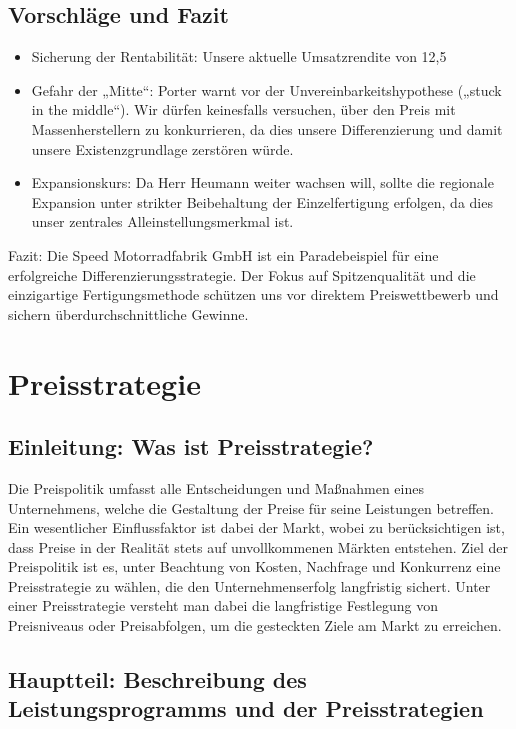 \documentclass[12pt, a4paper]{article}
\begin{document}
\subsection{Vorschläge und Fazit}
\begin{itemize}
    \item Sicherung der Rentabilität: Unsere aktuelle Umsatzrendite von 12,5 %
    \item Gefahr der „Mitte“: Porter warnt vor der Unvereinbarkeitshypothese („stuck in the middle“). Wir dürfen keinesfalls versuchen, über den Preis mit Massenherstellern zu konkurrieren, da dies unsere Differenzierung und damit unsere Existenzgrundlage zerstören würde.
    \item Expansionskurs: Da Herr Heumann weiter wachsen will, sollte die regionale Expansion unter strikter Beibehaltung der Einzelfertigung erfolgen, da dies unser zentrales Alleinstellungsmerkmal ist.
\end{itemize}
Fazit: Die Speed Motorradfabrik GmbH ist ein Paradebeispiel für eine erfolgreiche Differenzierungsstrategie.
Der Fokus auf Spitzenqualität und die einzigartige Fertigungsmethode schützen uns vor direktem Preiswettbewerb und sichern überdurchschnittliche Gewinne.
\newpage

\section{Preisstrategie}
\subsection{Einleitung: Was ist Preisstrategie?}
Die Preispolitik umfasst alle Entscheidungen und Maßnahmen eines Unternehmens,
welche die Gestaltung der Preise für seine Leistungen betreffen. Ein wesentlicher
Einflussfaktor ist dabei der Markt, wobei zu berücksichtigen ist, dass Preise in der 
Realität stets auf unvollkommenen Märkten entstehen. Ziel der Preispolitik ist es, 
unter Beachtung von Kosten, Nachfrage und Konkurrenz eine Preisstrategie zu wählen, 
die den Unternehmenserfolg langfristig sichert. Unter einer Preisstrategie versteht 
man dabei die langfristige Festlegung von Preisniveaus oder Preisabfolgen, um die 
gesteckten Ziele am Markt zu erreichen.

\subsection{Hauptteil: Beschreibung des Leistungsprogramms und der Preisstrategien}
\end{document}
